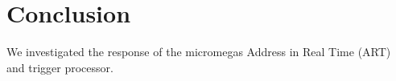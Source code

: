 \section{Conclusion}
\label{sec:conclusions}

We investigated the response of the micromegas Address in Real Time (ART) and trigger processor.


